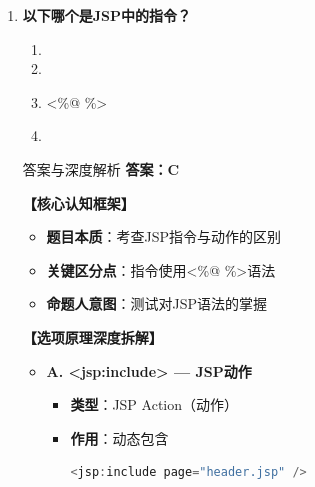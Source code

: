 \documentclass[12pt, a4paper]{ctexart}
\begin{document}
\begin{enumerate}[label=\textbf{\arabic*.}]
\begin{bluebox}{答案与深度解析}
\begin{enumerate}[leftmargin=*, nosep]
			      \item \textbf{高频陷阱清单}：
			            \begin{itemize}[label={}, nosep]
				            \item 陷阱1：JSP首次访问需编译，首次性能差
			            \end{itemize}
		      \end{enumerate}

		      \textbf{【命题趋势与实战策略】}

		      \textbf{考场秒杀技巧}：JSP首次访问编译，Servlet性能更稳定
	      \end{bluebox}

	\item \textbf{以下哪个是JSP中的指令？}
	      \begin{enumerate}[label=\Alph*.]
		      \item <jsp:include>
		      \item <jsp:forward>
		      \item <\%@ \%>
		      \item <jsp:param>
	      \end{enumerate}

	      \begin{bluebox}{答案与深度解析}
		      \textbf{答案：C}

		      \textbf{【核心认知框架】}
		      \begin{itemize}[label={}, leftmargin=*, nosep]
			      \item \textbf{题目本质}：考查JSP指令与动作的区别
			      \item \textbf{关键区分点}：指令使用<\%@ \%>语法
			      \item \textbf{命题人意图}：测试对JSP语法的掌握
		      \end{itemize}

		      \textbf{【选项原理深度拆解】}
					  \begin{itemize}[label={}, leftmargin=*, nosep]

		      \item \textbf{A. <jsp:include> — JSP动作}
		      \begin{itemize}[label={}, leftmargin=*, nosep]
			      \item \textbf{类型}：JSP Action（动作）
			      \item \textbf{作用}：动态包含
			            \begin{lstlisting}[language=Java]
<jsp:include page="header.jsp" />
      \end{lstlisting}
		      \end{itemize}


\end{itemize}
\end{bluebox}
\end{enumerate}
\end{document}
